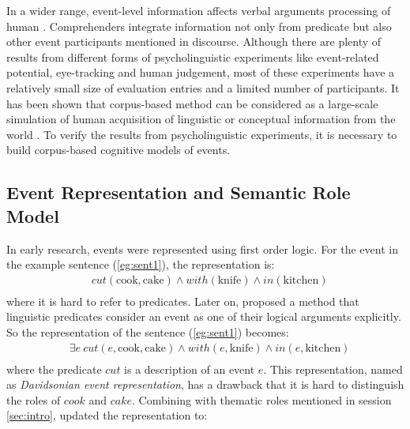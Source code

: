 \documentclass[a4paper]{article}
\begin{document}
In a wider range, event-level information affects verbal arguments processing of human \citep{bicknell2010effects}. Comprehenders integrate information not only from predicate but also other event participants mentioned in discourse. Although there are plenty of results from different forms of psycholinguistic experiments like event-related potential, eye-tracking and human judgement, most of these experiments have a relatively small size of evaluation entries and a limited number of participants. It has been shown that corpus-based method can be considered as a large-scale simulation of human acquisition of linguistic or conceptual information from the world \citep{landauer1997solution}. To verify the results from psycholinguistic experiments, it is necessary to build corpus-based cognitive models of events. 

\subsection{Event Representation and Semantic Role Model} \label{sec:semanticrole}
In early research, events were represented using first order logic. For the event in the example sentence (\ref{eg:sent1}), the representation is:
\begin{equation*} \label{eg:fol}
\begin{aligned}
    & cut(\text{cook}, \text{cake}) \land with(\text{knife}) \land in(\text{kitchen}) \\
\end{aligned}
\end{equation*}
where it is hard to refer to predicates. Later on, \citet{davidson1967logical} proposed a method that linguistic predicates consider an event as one of their logical arguments explicitly. So the representation of the sentence (\ref{eg:sent1}) becomes: 
\begin{equation*} \label{eg:davidsonian}
\begin{aligned}
    & \exists e\ cut(e, \text{cook}, \text{cake}) \land with(e, \text{knife}) \land in(e, \text{kitchen}) \\
\end{aligned}
\end{equation*}
where the predicate $cut$ is a description of an event $e$. This representation, named as \textit{Davidsonian event representation}, has a drawback that it is hard to distinguish the roles of $cook$ and $cake$. Combining with thematic roles mentioned in session \ref{sec:intro}, \citet{parsons1990events} updated the representation to: 
\end{document}
